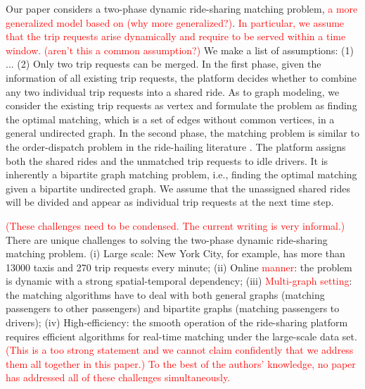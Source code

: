 \documentclass[sigconf]{acmart}
\newcommand{\tcr}[1]{{\textcolor{red}{#1}}}
\begin{document}
Our paper considers a two-phase dynamic ride-sharing matching problem,
\tcr{a more generalized model based on \cite{bei2018algorithms} (why more generalized?)}. 
\tcr{In particular, we assume that the trip requests arise dynamically and require to be served within a time window. (aren't this a common assumption?)} 
We make a list of assumptions: 
(1) ...
(2) Only two trip requests can be merged.
In the first phase, given the information
of all existing trip requests, the platform decides whether to combine
any two individual trip requests into a shared ride. %
As to graph modeling, we consider the existing trip requests as vertex
and formulate the problem as finding the optimal matching, which is
a set of edges without common vertices, in a general undirected graph.
In the second phase, the matching problem is similar to the order-dispatch
problem in the ride-hailing literature \cite{wang2018deep,xu2018large,li2019efficient,zhou2019multi}.
The platform assigns both the shared rides and the unmatched trip
requests to idle drivers. It is inherently a bipartite graph matching
problem, i.e., finding the optimal matching given a bipartite undirected
graph. We assume that the unassigned shared rides will be divided
and appear as individual trip requests at the next time step.

\tcr{(These challenges need to be condensed. The current writing is very informal.)}
There are unique challenges to solving the two-phase dynamic ride-sharing
matching problem. (i) Large scale: New York City, for example, has
more than 13000 taxis and 270 trip requests every minute; (ii) Online
\tcr{manner}: the problem is dynamic with a strong spatial-temporal dependency;
(iii) \tcr{Multi-graph setting}: the matching algorithms have to deal with
both general graphs (matching passengers to other passengers) and
bipartite graphs (matching passengers to drivers); (iv) High-efficiency:
the smooth operation of the ride-sharing platform requires efficient
algorithms for real-time matching under the large-scale data set. 
\tcr{(This is a too strong statement and we cannot claim confidently that we address them all together in this paper.) To the best of the authors' knowledge, no paper has addressed all of these challenges simultaneously.} 
\end{document}
